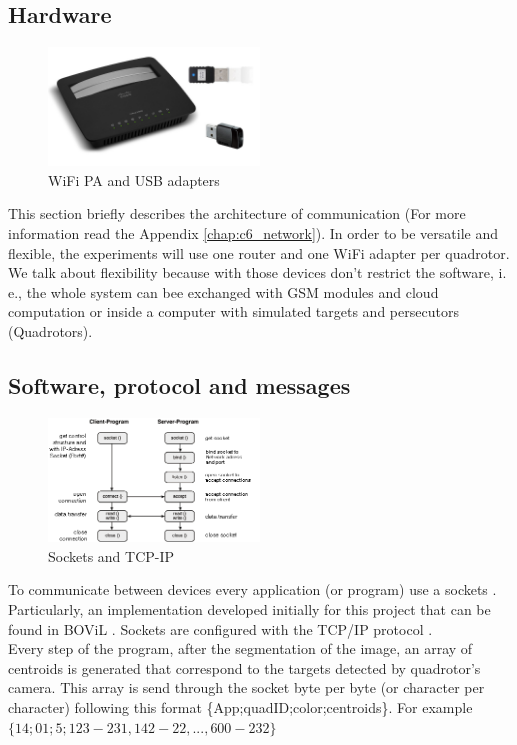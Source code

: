 \subsection{Hardware}
\begin{figure}
	\includegraphics[width=0.5\textwidth]{../Images/c2/hardware_comm.jpg}
	\caption{WiFi PA and USB adapters}
	\label{fig:hardwareComm}
\end{figure}

This section briefly describes the architecture of communication (For more information read the Appendix \ref{chap:c6_network}). In order to be versatile and flexible, the experiments will use one router and one WiFi adapter per quadrotor. We talk about flexibility because with those devices don't restrict the software, i. e., the whole system can bee exchanged with GSM modules and cloud computation or inside a computer with simulated targets and persecutors (Quadrotors).

\subsection{Software, protocol and messages}

\begin{figure}
	\begin{center}
		\includegraphics[width=0.5\textwidth, natwidth=448, natheight=263]{../Images/c2/socketstcpip.png}
	\end{center}
	\caption{Sockets and TCP-IP}
	\label{fig:socketstcpip}
\end{figure}

To communicate between devices every application (or program) use a sockets \cite{SocketWiki}. Particularly, an implementation developed initially for this project that can be found in BOViL \cite{BOViL}. Sockets are configured with the TCP/IP protocol \cite{TCPIP}. \\
Every step of the program, after the segmentation of the image, an array of centroids is generated that correspond to the targets detected by quadrotor's camera. This array is send through the socket byte per byte (or character per character) following this format \{App;quadID;color;centroids\}. For example $\{14;01;5;123-231,142-22,...,600-232\}$


